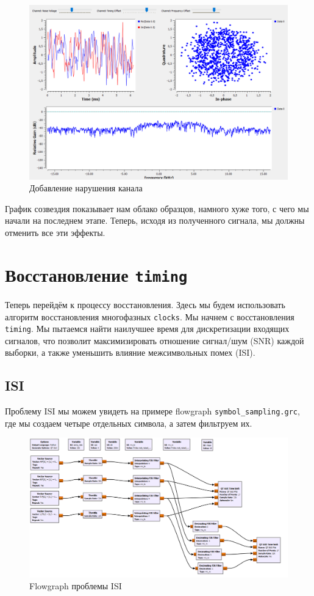 \documentclass[a4paper, 14pt]{extarticle}
\begin{document}
    \begin{figure}[H]
        \centering
        \includegraphics[width=0.8\linewidth]{channel_impairments}
        \caption{Добавление нарушения канала}
        \label{fig:channel_impairments}
    \end{figure}

    График созвездия показывает нам облако образцов, намного хуже того, с чего мы начали на последнем этапе.
    Теперь, исходя из полученного сигнала, мы должны отменить все эти эффекты.

    \newpage


    \section{Восстановление \texttt{timing}}
    \label{sec:3}

    Теперь перейдём к процессу восстановления.
    Здесь мы будем использовать алгоритм восстановления многофазных \texttt{clocks}.
    Мы начнем с восстановления \texttt{timing}.
    Мы пытаемся найти наилучшее время для дискретизации входящих сигналов, что позволит максимизировать отношение сигнал/шум (SNR) каждой выборки, а также уменьшить влияние межсимвольных помех (ISI).

    \subsection{ISI}

    Проблему ISI мы можем увидеть на примере flowgraph \texttt{symbol\_sampling.grc}, где мы создаем четыре отдельных символа, а затем фильтруем их.

    \begin{figure}[H]
        \centering
        \includegraphics[width=0.8\linewidth]{flowgraph_isi_problem}
        \caption{Flowgraph проблемы ISI}
        \label{fig:flowgraph_isi_problem}
    \end{figure}
\end{document}
